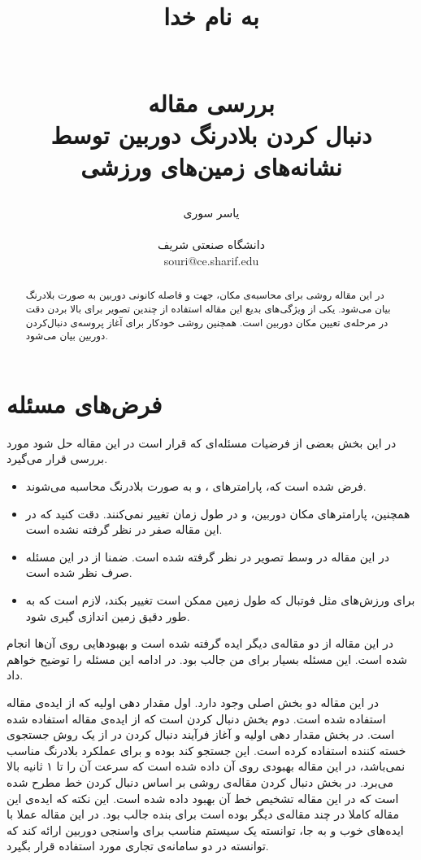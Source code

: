 \documentclass{report}
\title{
\begin{normalsize}
به نام خدا
\end{normalsize}
\\[2cm]
بررسی مقاله
\\[2cm]
دنبال کردن بلادرنگ دوربین توسط نشانه‌های زمین‌های ورزشی
}
\author{یاسر سوری
\\
\\ \small دانشگاه صنعتی شریف
\\ \small souri@ce.sharif.edu
}
\begin{document}
\maketitle

\begin{abstract}
در این مقاله روشی برای محاسبه‌ی مکان، جهت و فاصله کانونی دوربین به صورت بلادرنگ بیان می‌شود. یکی از ویژگی‌های بدیع این مقاله استفاده از چندین تصویر برای بالا بردن دقت در مرحله‌ی تعیین مکان دوربین است. همچنین روشی خودکار برای آغاز پروسه‌ی دنبال‌کردن دوربین بیان می‌شود.

\end{abstract}

\section{فرض‌های مسئله}
در این بخش بعضی از فرضیات مسئله‌ای که قرار است در این مقاله حل شود مورد بررسی قرار می‌گیرد.
\begin{itemize}
\item
فرض شده است که، پارامتر‌های ،  و  به صورت بلادرنگ محاسبه می‌شوند.
\item
همچنین، پارامترهای مکان دوربین،  و  در طول زمان تغییر نمی‌کنند. دقت کنید که در این مقاله  صفر در نظر گرفته نشده است.
\item
در این مقاله  در وسط تصویر در نظر گرفته شده است. ضمنا از  در این مسئله صرف نظر شده است.
\item
برای ورزش‌های مثل فوتبال که طول زمین ممکن است تغییر بکند، لازم است که به طور دقیق زمین اندازی گیری شود.
\end{itemize}
در این مقاله از دو مقاله‌ی دیگر ایده گرفته شده است و بهبود‌هایی روی آن‌ها انجام شده است. این مسئله بسیار برای من جالب بود. در ادامه این مسئله را توضیح خواهم داد.

در این مقاله دو بخش اصلی وجود دارد. اول مقدار دهی اولیه  که از ایده‌ی مقاله \cite{ct16} استفاده شده است. دوم بخش دنبال کردن است که از ایده‌ی مقاله \cite{ct15} استفاده شده است. در بخش مقدار دهی اولیه و آغاز فرآیند دنبال کردن در \cite{ct16} از یک روش جستجوی خسته کننده  استفاده کرده است. این جستجو کند بوده و برای عملکرد بلادرنگ مناسب نمی‌باشد، در این مقاله بهبودی روی آن داده شده است که سرعت آن را تا ۱ ثانیه بالا می‌برد. در بخش دنبال کردن مقاله‌ی \cite{ct15} روشی بر اساس دنبال کردن خط مطرح شده است که در این مقاله تشخیص خط آن بهبود داده شده است.
این نکته که ایده‌ی این مقاله کاملا در چند مقاله‌ی دیگر بوده است برای بنده جالب بود. در این مقاله عملا با ایده‌های خوب و به جا، توانسته یک سیستم مناسب برای واسنجی دوربین ارائه کند که توانسته در دو سامانه‌ی تجاری مورد استفاده قرار بگیرد.
\end{document}
